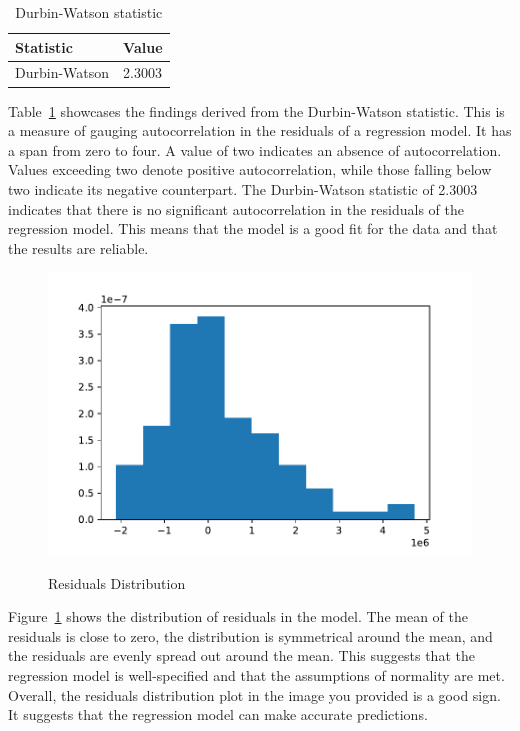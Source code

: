 \documentclass[12pt]{article}
\begin{document}
\bigskip
\bigskip

\begin{table}[h!]
\caption{Durbin-Watson statistic}
  \label{tab:re}
 \begin{center} 
\begin{tabular}{ll}
  \toprule
Statistic & Value \\
  \midrule
Durbin-Watson & 2.3003 \\ 
   \bottomrule
\end{tabular}\par
\end{center}
\end{table}
Table~\ref{tab:re} showcases the findings derived from the Durbin-Watson statistic. This is a measure of gauging autocorrelation in the residuals of a regression model. It has a span from zero to four. A value of two indicates an absence of autocorrelation. Values exceeding two denote positive autocorrelation, while those falling below two indicate its negative counterpart. The Durbin-Watson statistic of 2.3003 indicates that there is no significant autocorrelation in the residuals of the regression model. This means that the model is a good fit for the data and that the results are reliable.

\begin{figure}[h!]
    \caption{Residuals Distribution}
    \includegraphics[width=1\textwidth]{residuals_distribution.pdf}
    \label{fig:residuals_distribution}
\end{figure}
Figure~\ref{fig:residuals_distribution} shows the distribution of residuals in the model. The mean of the residuals is close to zero, the distribution is symmetrical around the mean, and the residuals are evenly spread out around the mean. This suggests that the regression model is well-specified and that the assumptions of normality are met. Overall, the residuals distribution plot in the image you provided is a good sign. It suggests that the regression model can make accurate predictions.
\end{document}
